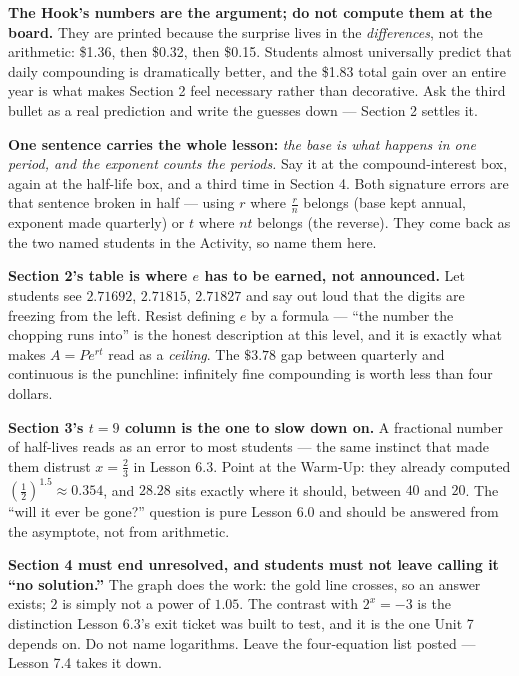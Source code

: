 \documentclass[10pt]{article}
\begin{document}
\begin{teachernote}
\textbf{The Hook's numbers are the argument; do not compute them at the board.} They are printed
because the surprise lives in the \emph{differences}, not the arithmetic: \$1.36, then \$0.32, then
\$0.15. Students almost universally predict that daily compounding is dramatically better, and the
\$1.83 total gain over an entire year is what makes Section 2 feel necessary rather than decorative.
Ask the third bullet as a real prediction and write the guesses down --- Section 2 settles it.

\textbf{One sentence carries the whole lesson:} \emph{the base is what happens in one period, and the
exponent counts the periods.} Say it at the compound-interest box, again at the half-life box, and a
third time in Section 4. Both signature errors are that sentence broken in half --- using $r$ where
$\frac{r}{n}$ belongs (base kept annual, exponent made quarterly) or $t$ where $nt$ belongs (the
reverse). They come back as the two named students in the Activity, so name them here.

\textbf{Section 2's table is where $e$ has to be earned, not announced.} Let students see $2.71692$,
$2.71815$, $2.71827$ and say out loud that the digits are freezing from the left. Resist defining $e$
by a formula --- ``the number the chopping runs into'' is the honest description at this level, and it
is exactly what makes $A=Pe^{rt}$ read as a \emph{ceiling}. The $\$3.78$ gap between quarterly and
continuous is the punchline: infinitely fine compounding is worth less than four dollars.

\textbf{Section 3's $t=9$ column is the one to slow down on.} A fractional number of half-lives reads
as an error to most students --- the same instinct that made them distrust $x=\frac23$ in Lesson 6.3.
Point at the Warm-Up: they already computed $\left(\frac12\right)^{1.5}\approx0.354$, and
$28.28$ sits exactly where it should, between $40$ and $20$. The ``will it ever be gone?'' question is
pure Lesson 6.0 and should be answered from the asymptote, not from arithmetic.

\textbf{Section 4 must end unresolved, and students must not leave calling it ``no solution.''} The
graph does the work: the gold line crosses, so an answer exists; $2$ is simply not a power of $1.05$.
The contrast with $2^{x}=-3$ is the distinction Lesson 6.3's exit ticket was built to test, and it is
the one Unit 7 depends on. Do not name logarithms. Leave the four-equation list posted --- Lesson 7.4
takes it down.
\end{teachernote}
\end{document}
